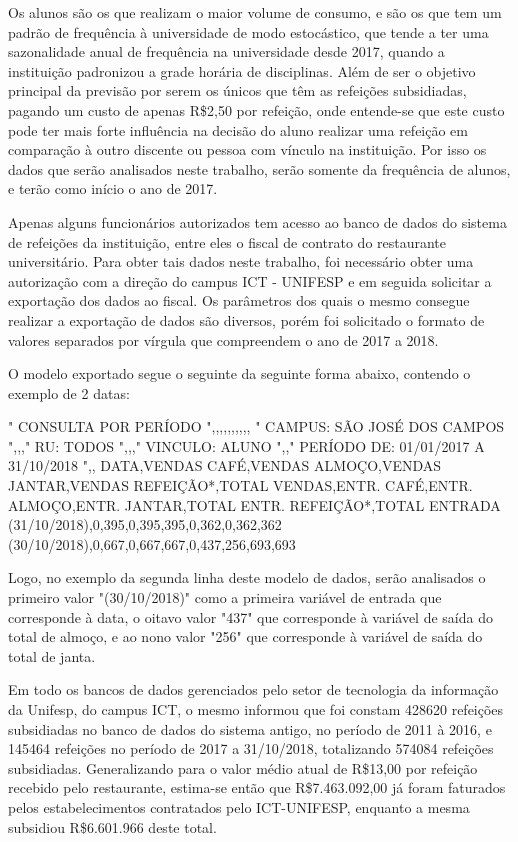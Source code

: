 \documentclass[	12pt, Times, openright, twoside, a4paper, english, brazil]{abntex2}
\begin{document}
Os alunos são os que realizam o maior volume de consumo, e são os que tem um padrão de frequência à universidade de modo estocástico, que tende a ter uma sazonalidade anual de frequência na universidade desde 2017, quando a instituição padronizou a grade horária de disciplinas.  Além de ser o objetivo principal da previsão por serem os únicos que têm as refeições subsidiadas, pagando um custo de apenas R\$2,50 por refeição, onde entende-se que este custo pode ter mais forte influência na decisão do aluno realizar uma refeição em comparação à outro discente ou pessoa com vínculo na instituição. Por isso os dados que serão analisados neste trabalho, serão somente da frequência de alunos, e terão como início o ano de 2017. 

Apenas alguns funcionários autorizados tem acesso ao banco de dados do sistema de refeições da instituição, entre eles o fiscal de contrato do restaurante universitário. Para obter tais dados neste trabalho, foi necessário obter uma autorização com a direção do campus ICT - UNIFESP e em seguida solicitar a exportação dos dados ao fiscal. Os parâmetros dos quais o mesmo consegue realizar a exportação de dados são diversos, porém foi solicitado o formato de valores separados por vírgula que compreendem o ano de 2017 a 2018.

O modelo exportado segue o seguinte da seguinte forma abaixo, contendo o exemplo de 2 datas: 
\begin{algorithm}[H]
"
CONSULTA POR PERÍODO                    ",,,,,,,,,,
"
CAMPUS: SÃO JOSÉ DOS CAMPOS                    ",,,"
RU: TODOS                    ",,,"
VINCULO: ALUNO                    ",,"
PERÍODO DE: 01/01/2017 A 31/10/2018                        ",,
DATA,VENDAS CAFÉ,VENDAS ALMOÇO,VENDAS JANTAR,VENDAS REFEIÇÃO*,TOTAL VENDAS,ENTR. CAFÉ,ENTR. ALMOÇO,ENTR. JANTAR,TOTAL ENTR. REFEIÇÃO*,TOTAL ENTRADA
(31/10/2018),0,395,0,395,395,0,362,0,362,362
(30/10/2018),0,667,0,667,667,0,437,256,693,693
\end{algorithm}

Logo, no exemplo da segunda linha deste modelo de dados, serão analisados o primeiro valor "(30/10/2018)" como a primeira variável de entrada que corresponde à data, o oitavo valor "437" que corresponde à variável de saída do total de almoço, e ao nono valor "256" que corresponde à variável de saída do total de janta.

Em todo os bancos de dados gerenciados pelo setor de tecnologia da informação da Unifesp, do campus ICT, o mesmo informou que foi constam 428620 refeições subsidiadas no banco de dados do sistema antigo, no período de 2011 à 2016, e 145464 refeições no período de 2017 a 31/10/2018, totalizando 574084 refeições subsidiadas. Generalizando para o valor médio atual de R\$13,00 por refeição recebido pelo restaurante, estima-se então que R\$7.463.092,00 já foram faturados pelos estabelecimentos contratados pelo ICT-UNIFESP, enquanto a mesma subsidiou R\$6.601.966 deste total.
\end{document}
